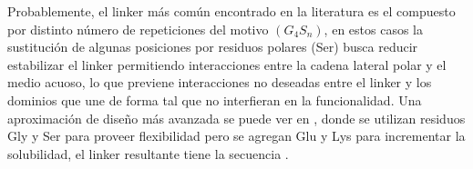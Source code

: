 Probablemente, el linker más común encontrado en la literatura es el compuesto por distinto número de repeticiones del motivo $(G_4S_n)$, %
en estos casos la sustitución de algunas posiciones por residuos polares (Ser) busca reducir estabilizar el linker permitiendo interacciones entre la cadena lateral polar y el medio acuoso,
lo que previene interacciones no deseadas entre el linker y los dominios que une de forma tal que no interfieran en la funcionalidad.
Una aproximación de diseño más avanzada se puede ver en \cite{bird1988single}, donde se utilizan residuos Gly y Ser para proveer flexibilidad pero se agregan Glu y Lys para incrementar la solubilidad,
el linker resultante tiene la secuencia \textit{}.




